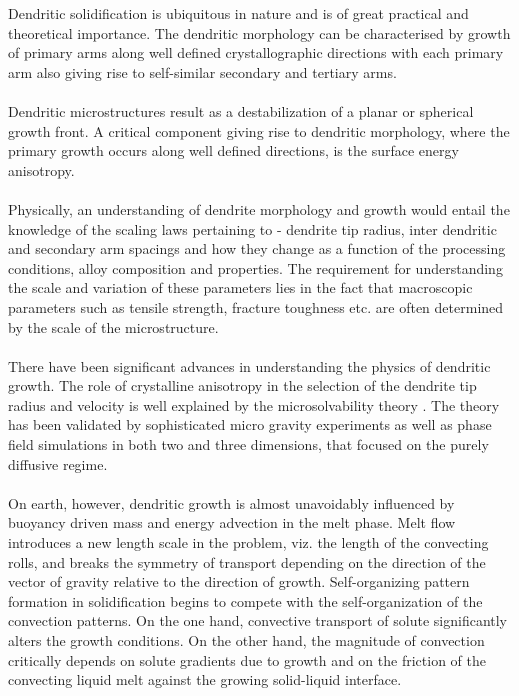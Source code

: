 \documentclass[12pt,a4paper]{report}
\begin{document}
Dendritic solidification is ubiquitous in nature and is
of great practical and theoretical importance. The 
dendritic morphology can be characterised by growth 
of primary arms along well defined crystallographic 
directions with each primary arm also giving rise to 
self-similar secondary and tertiary arms.\\
\\
Dendritic microstructures result as a destabilization 
of a planar or spherical growth front. A critical 
component giving rise to dendritic morphology, where 
the primary growth occurs along well defined 
directions, is the surface energy anisotropy.\\
\\
Physically, an understanding of dendrite morphology 
and growth would entail the knowledge of the scaling 
laws pertaining to -  dendrite tip radius, inter 
dendritic and secondary arm spacings and how they 
change as a function of the processing conditions, 
alloy composition and properties. The requirement 
for understanding the scale and variation of these 
parameters lies in the fact that macroscopic parameters 
such as tensile strength, fracture toughness etc. 
are often determined by the scale of the microstructure.\\
\\
There have been significant advances in understanding 
the physics of dendritic growth. The role of crystalline 
anisotropy in the selection of the dendrite tip radius 
and velocity is well explained by the microsolvability theory \cite{MS_theory}. 
The theory has been validated by sophisticated micro gravity 
experiments as well as phase field simulations in both two and 
three dimensions, that focused on the purely diffusive 
regime.\\
\\
On earth, however, dendritic growth is almost unavoidably influenced by buoyancy driven 
mass and energy advection in the melt phase. Melt flow introduces a new length scale in 
the problem, viz. the length of the convecting rolls, and breaks the symmetry of transport 
depending on the direction of the vector of gravity relative to the direction of growth. 
Self-organizing pattern formation in solidification begins to compete with the self-organization 
of the convection patterns. On the one hand, convective transport of solute significantly alters the 
growth conditions. On the other hand, the magnitude of convection critically depends on solute 
gradients due to growth and on the friction of the convecting liquid melt against the 
growing solid-liquid interface\cite{Stein}.
\end{document}
